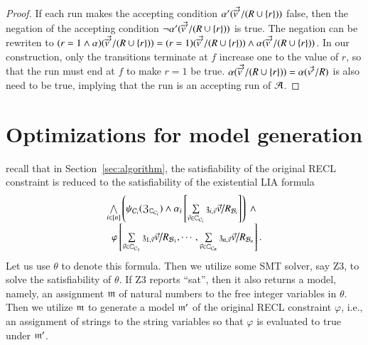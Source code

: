 {\begin{proof}
 If each run makes the accepting condition $\alpha'(\vec{\overline{v}'}/(R\cup\{r\}))$ false, then the negation of the accepting condition $\neg\alpha'(\vec{\overline{v}'}/(R\cup\{r\}))$ is true. The negation can be rewriten to $(r=1\wedge \alpha)(\vec{\overline{v}'}/(R\cup\{r\})) = (r=1)(\vec{\overline{v}'}/(R\cup\{r\}))\wedge \alpha(\vec{\overline{v}'}/(R\cup\{r\}))$. In our construction, only the transitions terminate at $f$ increase one to the value of $r$, so that the run must end at $f$ to make $r=1$ be true. $\alpha(\vec{\overline{v}'}/(R\cup\{r\})) = \alpha(\vec{v'}/R)$ is also need to be true, implying that the run is an accepting run of $\mathcal{A}$.
\end{proof}
}

\section{Optimizations for model generation}\label{sec-opt-sol-gen}

 recall that in Section~\ref{sec:algorithm}, the satisfiability of the original RECL constraint is reduced to the satisfiability of the existential LIA formula
\[
\begin{array}{l}
\bigwedge \limits_{i \in [n]} \left(\psi_{\cC_i}(\fZ_{\costset_{\cC_i}}) \wedge \alpha_i\left[\sum\limits_{\myvec{v} \in \costset_{\cC_i}} \anivarz_{i, \myvec{v}} \myvec{v} \big{/}R_{\cB_i}  \right] \right) \ \wedge \\
\ \ \varphi \left[ \sum\limits_{\myvec{v} \in \costset_{\cC_1}} \anivarz_{1, \myvec{v}} \myvec{v} \big{/}R_{\cB_1}, \cdots, \sum\limits_{\myvec{v} \in \costset_{\cC_n}} \anivarz_{n, \myvec{v}} \myvec{v} \big{/}R_{\cB_n} \right].
\end{array}
\]
Let us use $\theta$ to denote this formula. 
Then we utilize some SMT solver, say Z3, to solve the satisfiability of $\theta$. If Z3 reports ``sat'', then it also returns a model, namely, an assignment $\mathfrak{m}$ of natural numbers to the free integer variables in $\theta$. Then we utilize $\mathfrak{m}$ to generate a model $\mathfrak{m}'$ of the original RECL constraint $\varphi$, i.e., an assignment of strings to the string variables so that $\varphi$ is evaluated to true under $\mathfrak{m}'$. 

